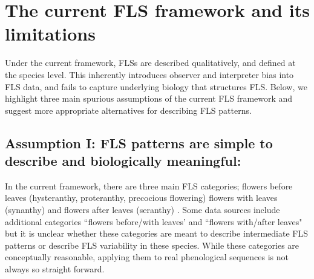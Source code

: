 \documentclass{article}
\begin{document}
\section*{The current FLS framework and its limitations}
Under the current framework, FLSs are described qualitatively, and defined at the species level. This inherently introduces observer and interpreter bias into FLS data, and fails to capture underlying biology that structures FLS. Below, we highlight three main spurious assumptions of the current FLS framework and suggest more appropriate alternatives for describing FLS patterns.
\subsection*{Assumption I: FLS patterns are simple to describe and biologically meaningful:}
In the current framework, there are three main FLS categories; flowers before leaves (hysteranthy, proteranthy, precocious flowering) flowers with leaves (synanthy) and flowers after leaves (seranthy) \citep{Lamont2011, Heinig1899}. Some data sources \citep[e.g.][]{Burns1990,Barnes2004} include additional categories ``flowers before/with leaves' and ``flowers with/after leaves" but it is unclear whether these categories are meant to describe intermediate FLS patterns or describe FLS variability in these species. While these categories are conceptually reasonable, applying them to real phenological sequences is not always so straight forward.
\end{document}
